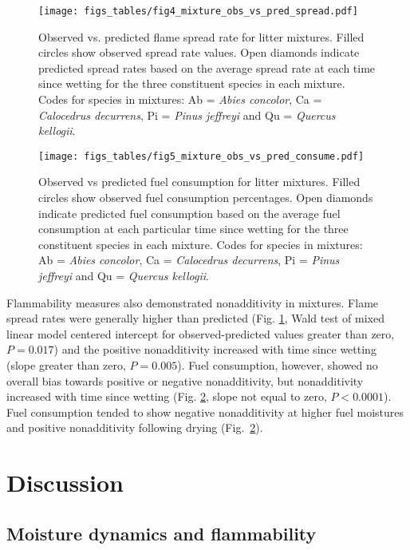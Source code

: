 \documentclass[letterpaper,12pt]{article}
\begin{document}
\begin{figure}
  \centering
\texttt{[image: figs\_tables/fig4\_mixture\_obs\_vs\_pred\_spread.pdf]}
\caption{Observed vs. predicted flame spread rate for litter mixtures. Filled
  circles show observed spread rate values. Open diamonds indicate predicted
  spread rates based on the average spread rate at each time since wetting for
  the three constituent species in each mixture. Codes for species in mixtures:
  Ab = \emph{Abies concolor}, Ca = \emph{Calocedrus decurrens}, Pi =
  \emph{Pinus jeffreyi} and Qu = \emph{Quercus kellogii}.}
  \label{fig:mixture_obs_pred_spread}
\end{figure}


\begin{figure}
  \centering
\texttt{[image: figs\_tables/fig5\_mixture\_obs\_vs\_pred\_consume.pdf]}
\caption{Observed vs predicted fuel consumption for litter mixtures. Filled
  circles show observed fuel consumption percentages. Open diamonds indicate
  predicted fuel consumption based on the average fuel consumption at each
  particular time since wetting for the three constituent species in each
  mixture. Codes for species in mixtures: Ab = \emph{Abies concolor}, Ca =
  \emph{Calocedrus decurrens}, Pi = \emph{Pinus jeffreyi} and Qu =
  \emph{Quercus kellogii}.}
  \label{fig:mixture_obs_pred_consume}
\end{figure}


Flammability measures also demonstrated nonadditivity in mixtures. Flame spread
rates were generally higher than predicted (Fig.
\ref{fig:mixture_obs_pred_spread}, Wald test of mixed linear model centered
intercept for observed-predicted values greater than zero, $P = 0.017$) and the
positive nonadditivity increased with time since wetting (slope greater than
zero, $P = 0.005$). Fuel consumption, however, showed no overall bias towards
positive or negative nonadditivity, but nonadditivity increased with time since
wetting (Fig. \ref{fig:mixture_obs_pred_consume}, slope not equal to zero,
$P < 0.0001$). Fuel consumption tended to show negative nonadditivity at higher
fuel moistures and positive nonadditivity following drying
(Fig.~\ref{fig:mixture_obs_pred_consume}).


\section*{Discussion}

\subsection*{Moisture dynamics and flammability}
\end{document}
